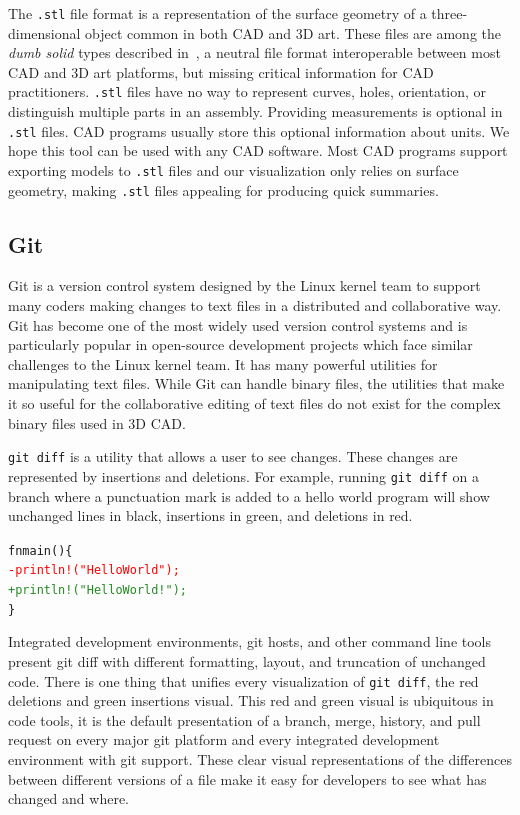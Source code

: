 \documentclass[sigconf,authorversion,nonacm]{acmart}
\begin{document}
The \texttt{.stl} file format is a representation of the surface geometry of a three-dimensional object common in both CAD and 3D art.
These files are among the \textit{dumb solid} types described in~\cite{cheng2023age}, a neutral file format interoperable between most CAD and 3D art platforms, but missing critical information for CAD practitioners.
\texttt{.stl} files have no way to represent curves, holes, orientation, or distinguish multiple parts in an assembly.
Providing measurements is optional in \texttt{.stl} files. CAD programs usually store this optional information about units.
We hope this tool can be used with any CAD software.
Most CAD programs support exporting models to \texttt{.stl} files and our visualization only relies on surface geometry, making \texttt{.stl} files appealing for producing quick summaries.

\subsection{Git}

Git is a version control system designed by the Linux kernel team to support many coders making changes to text files in a distributed and collaborative way.
Git has become one of the most widely used version control systems and is particularly popular in open-source development projects which face similar challenges to the Linux kernel team.
It has many powerful utilities for manipulating text files.
While Git can handle binary files, the utilities that make it so useful for the collaborative editing of text files do not exist for the complex binary files used in 3D CAD.

\texttt{git diff} is a utility that allows a user to see changes.
These changes are represented by insertions and deletions.
For example, running \texttt{git diff} on a branch where a punctuation mark is added to a hello world program will show unchanged lines in black, insertions in green, and deletions in red.

\begin{alltt}
	fn main ()\{
	\textcolor{red}{   - println!("Hello World");}
	\textcolor{ForestGreen}{   + println!("Hello World!");}
	\}
\end{alltt}

Integrated development environments, git hosts, and other command line tools present git diff with different formatting, layout, and truncation of unchanged code.
There is one thing that unifies every visualization of \texttt{git diff}, the red deletions and green insertions visual.
This red and green visual is ubiquitous in code tools, it is the default presentation of a branch, merge, history, and pull request on every major git platform and every integrated development environment with git support.
These clear visual representations of the differences between different versions of a file make it easy for developers to see what has changed and where.
\end{document}

